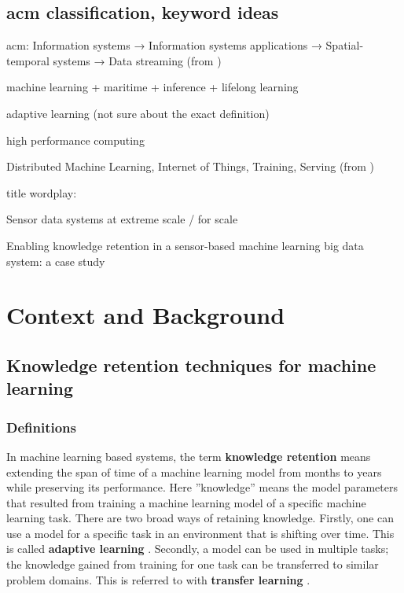 \section{acm classification,  keyword ideas}

acm:
Information systems → Information systems applications →
Spatial-temporal systems → Data streaming (from \cite{uprctrajectorysystem})

machine learning + maritime + inference + lifelong learning

adaptive learning (not sure about the exact definition)

high performance computing

Distributed Machine Learning, Internet of Things, Training, Serving (from \cite{mliot})

title wordplay:

Sensor data systems at extreme scale / for scale

Enabling knowledge retention in a sensor-based machine learning big data system: a case study


\chapter{Context and Background}

\section{Knowledge retention techniques for machine learning}

\subsection{Definitions}




In machine learning based systems, the term \textbf{knowledge retention} means extending the span of time of a machine learning model from months to years while preserving its performance. Here ''knowledge'' means the model parameters that resulted from training a machine learning model of a specific machine learning task. There are two broad ways of retaining knowledge. Firstly, one can use a model for a specific task in an environment that is shifting over time. This is called \textbf{adaptive learning} \cite{conceptdriftsurvey}. Secondly, a model can be used in multiple tasks; the knowledge gained from training for one task can be transferred to similar problem domains. This is referred to with \textbf{transfer learning} \cite{lmlsystems}.

